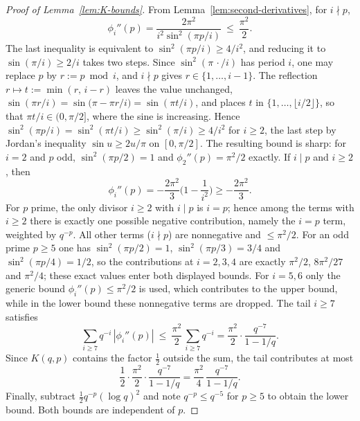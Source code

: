 \begin{proof}[Proof of Lemma~\ref{lem:K-bounds}]
From Lemma~\ref{lem:second-derivatives}, for $i\nmid p$,
\[
\phi_i''(p)=\frac{2\pi^2}{i^2\sin^2(\pi p/i)}\ \le\ \frac{\pi^2}{2}.
\]
The last inequality is equivalent to $\sin^2(\pi p/i)\ge 4/i^2$, and reducing it to
$\sin(\pi/i)\ge 2/i$ takes two steps. Since $\sin^2(\pi\,\cdot/i)$ has period $i$, one may
replace $p$ by $r:=p\bmod i$, and $i\nmid p$ gives $r\in\{1,\dots,i-1\}$. The reflection
$r\mapsto t:=\min(r,\,i-r)$ leaves the value unchanged, $\sin(\pi r/i)=\sin\bigl(\pi-\pi r/i\bigr)
=\sin(\pi t/i)$, and places $t$ in $\{1,\dots,\lfloor i/2\rfloor\}$, so that
$\pi t/i\in(0,\pi/2]$, where the sine is increasing. Hence
$\sin^2(\pi p/i)=\sin^2(\pi t/i)\ge\sin^2(\pi/i)\ge 4/i^2$ for $i\ge2$, the last step by
Jordan's inequality $\sin u\ge 2u/\pi$ on $[0,\pi/2]$. The resulting bound is sharp: for
$i=2$ and $p$ odd, $\sin^2(\pi p/2)=1$ and $\phi_2''(p)=\pi^2/2$ exactly. If $i\mid p$ and $i\ge2$, then
\[
\phi_i''(p)=-\frac{2\pi^2}{3}\Big(1-\frac{1}{i^2}\Big)\ge -\frac{2\pi^2}{3}.
\]
For $p$ prime, the only divisor $i\ge 2$ with $i\mid p$ is $i=p$; hence among the terms with $i\ge2$ there is exactly one possible negative contribution, namely the $i=p$ term, weighted by $q^{-p}$. All other terms ($i\nmid p$) are nonnegative and $\le \pi^2/2$. For an odd prime $p\ge5$ one has $\sin^2(\pi p/2)=1$, $\sin^2(\pi p/3)=3/4$ and $\sin^2(\pi p/4)=1/2$, so the contributions at $i=2,3,4$ are exactly $\pi^2/2$, $8\pi^2/27$ and $\pi^2/4$; these exact values enter both displayed bounds. For $i=5,6$ only the generic bound $\phi_i''(p)\le\pi^2/2$ is used, which contributes to the upper bound, while in the lower bound these nonnegative terms are dropped. The tail $i\ge7$ satisfies
\[
\sum_{i\ge7}q^{-i}\,|\phi_i''(p)|\ \le\ \frac{\pi^2}{2}\,\sum_{i\ge7}q^{-i}
=\frac{\pi^2}{2}\cdot\frac{q^{-7}}{1-1/q}.
\]
Since $K(q,p)$ contains the factor $\tfrac12$ outside the sum, the tail contributes at most
\[
\frac12\cdot \frac{\pi^2}{2}\cdot\frac{q^{-7}}{1-1/q}=\frac{\pi^2}{4}\,\frac{q^{-7}}{1-1/q}.
\]
Finally, subtract $\tfrac{1}{2}q^{-p}(\log q)^2$ and note $q^{-p}\le q^{-5}$ for $p\ge5$ to obtain the lower bound. Both bounds are independent of $p$.


\end{proof}
